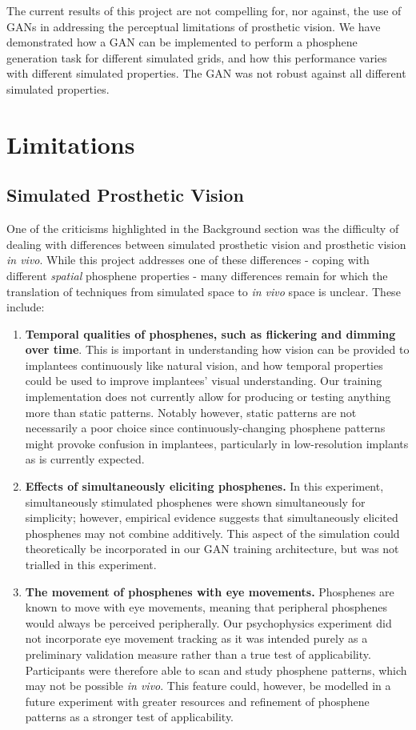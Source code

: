\documentclass[a4paper,11pt,openany]{book}
\begin{document}
The current results of this project are not compelling for, nor against, the use of GANs in addressing the perceptual limitations of prosthetic vision.
We have demonstrated how a GAN can be implemented to perform a phosphene generation task for different simulated grids, and how this performance varies with different simulated properties.
The GAN was not robust against all different simulated properties.

\chapter{Limitations}
\label{sec:orgfc500d0}

\section*{Simulated Prosthetic Vision}
\label{sec:orgb922ca9}

One of the criticisms highlighted in the Background section was the difficulty of dealing with differences between simulated prosthetic vision and prosthetic vision \emph{in vivo}.
While this project addresses one of these differences - coping with different \emph{spatial} phosphene properties - many differences remain for which the translation of techniques from simulated space to \emph{in vivo} space is unclear.
These include:
\begin{enumerate}
\item \textbf{Temporal qualities of phosphenes, such as flickering and dimming over time}.
This is important in understanding how vision can be provided to implantees continuously like natural vision, and how temporal properties could be used to improve implantees' visual understanding.
Our training implementation does not currently allow for producing or testing anything more than static patterns.
Notably however, static patterns are not necessarily a poor choice since continuously-changing phosphene patterns might provoke confusion in implantees, particularly in low-resolution implants as is currently expected.
\item \textbf{Effects of simultaneously eliciting phosphenes.}
In this experiment, simultaneously stimulated phosphenes were shown simultaneously for simplicity; however, empirical evidence suggests that simultaneously elicited phosphenes may not combine additively.
This aspect of the simulation could theoretically be incorporated in our GAN training architecture, but was not trialled in this experiment.
\item \textbf{The movement of phosphenes with eye movements.}
Phosphenes are known to move with eye movements, meaning that peripheral phosphenes would always be perceived peripherally.
Our psychophysics experiment did not incorporate eye movement tracking as it was intended purely as a preliminary validation measure rather than a true test of applicability.
Participants were therefore able to scan and study phosphene patterns, which may not be possible \emph{in vivo}.
This feature could, however, be modelled in a future experiment with greater resources and refinement of phosphene patterns as a stronger test of applicability.
\end{enumerate}
\end{document}
